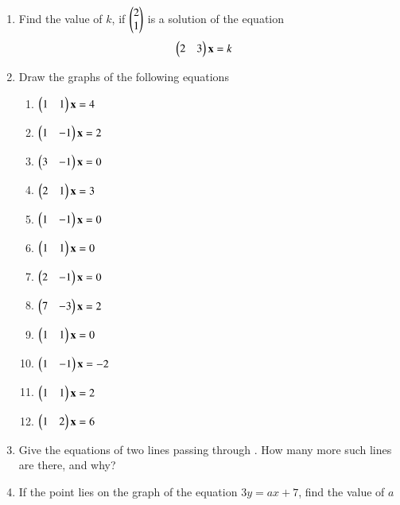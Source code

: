 \begin{enumerate}[label=\arabic*.,ref=\thesubsection.\theenumi]
\begin{enumerate}[itemsep=2pt]
\end{enumerate}
%
\item Find the value of $k$, if $\begin{pmatrix}2\\1\end{pmatrix}$ is a solution of the equation 
%
%
\begin{align}
\begin{pmatrix}2 & 3\end{pmatrix}\mathbf{x} &= k
\end{align}
%
%
\item Draw the graphs of the following equations
\begin{enumerate}[itemsep=2pt]
\item $\begin{pmatrix}1 & 1\end{pmatrix}\mathbf{x} = 4$
\item $\begin{pmatrix} 1 & -1\end{pmatrix}\mathbf{x}  = 2 $
\item $\begin{pmatrix} 3 & -1\end{pmatrix}\mathbf{x}  = 0$
\item $\begin{pmatrix} 2 & 1\end{pmatrix}\mathbf{x}  = 3$
\item $\begin{pmatrix} 1 & -1\end{pmatrix}\mathbf{x}  = 0$
\item $\begin{pmatrix} 1& 1\end{pmatrix}\mathbf{x}  = 0$
\item $\begin{pmatrix} 2& -1\end{pmatrix}\mathbf{x}  = 0$
\item $\begin{pmatrix} 7& -3\end{pmatrix}\mathbf{x}  = 2$
\item $\begin{pmatrix} 1& 1\end{pmatrix}\mathbf{x}  = 0$
\item $\begin{pmatrix} 1& -1\end{pmatrix}\mathbf{x}  = -2$
\item $\begin{pmatrix} 1& 1\end{pmatrix}\mathbf{x}  = 2$
\item $\begin{pmatrix} 1& 2\end{pmatrix}\mathbf{x}  = 6$
\end{enumerate}
%
\item Give the equations of two lines passing through . How many more such lines are there, and why?
\item If the point  lies on the graph of the equation $3y = ax + 7$, find the value of $a$

\end{enumerate}
